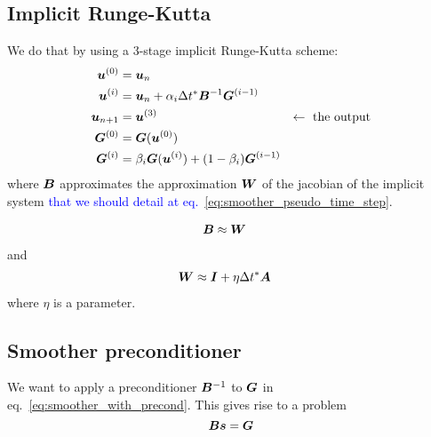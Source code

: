 \documentclass{article}
\newcommand{\todo}[1]{\textcolor{blue}{#1}}
\begin{document}
\subsection{Implicit Runge-Kutta}

We do that by using a 3-stage implicit Runge-Kutta scheme:
\begin{subequations}
\begin{align}
    \bm{u}^{(0)}        &= \bm{u}_{n} \\
    \bm{u}^{(i)}        &= \bm{u}_{n} + \alpha_i\Delta t^*\bm{B}^{-1}\bm{G}^{(i-1)}
            \label{eq:smoother_with_precond} \\
    \bm{u}_{n+1}        &= \bm{u}^{(3)} & \leftarrow \text{ the output}\\
    \bm{G}^{(0)}  &= \bm{G}(\bm{u}^{(0)}) \\
    \bm{G}^{(i)}  &= \beta_i\bm{G}(\bm{u}^{(i)}) + (1-\beta_i)\bm{G}^{(i-1)}
\end{align}
\end{subequations}
where $\bm{B}$ approximates the approximation $\bm{W}$ of the jacobian of the implicit system
\todo{that we should detail at eq.~\ref{eq:smoother_pseudo_time_step}}.

\begin{align}
    \bm{B} &\approx \bm{W}
\end{align}
and
\begin{align}
    \bm{W}        &\approx \bm{I} + \eta\Delta t^*\bm{A}
\end{align}
where $\eta$ is a parameter.

\subsection{Smoother preconditioner}

We want to apply a preconditioner $\bm{B}^{-1}$ to $\bm{G}$
in eq.~\ref{eq:smoother_with_precond}. This gives rise to a problem
\begin{equation}
    \bm{B} \bm{s} = \bm{G} \label{eq:precond_system}
\end{equation}
\end{document}
